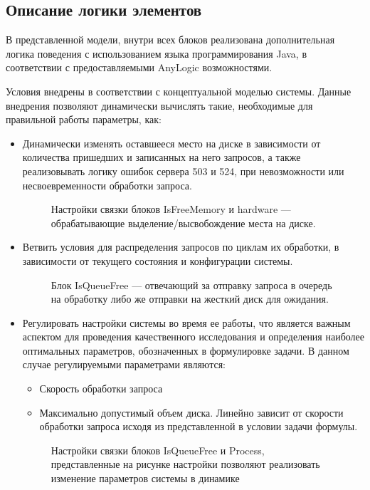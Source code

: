 \subsection{Описание логики элементов}
В представленной модели, внутри всех блоков реализована дополнительная логика поведения
с использованием языка программирования Java, в соответствии с предоставляемыми AnyLogic
возможностями.

Условия внедрены в соответствии с концептуальной моделью системы. Данные внедрения
позволяют динамически вычислять такие, необходимые для правильной работы параметры,
как:
\begin{itemize}
    \item Динамически изменять оставшееся место на диске в зависимости от количества
    пришедших и записанных на него запросов, а также реализовывать логику
    ошибок сервера 503 и 524, при невозможности или несвоевременности
    обработки запроса.
    \begin{figure} [h]
        \caption{Настройки связки блоков IsFreeMemory и hardware ---
        обрабатывающие выделение/высвобождение места на диске.}
    \end{figure}
    \item Ветвить условия для распределения запросов по циклам их обработки, в зависимости
    от текущего состояния и конфигурации системы.
    \begin{figure} [h]
        \caption{Блок IsQueueFree --- отвечающий за отправку запроса в очередь
        на обработку либо же отправки на жесткий диск для ожидания.}
    \end{figure}

    \item Регулировать настройки системы во время ее работы, что является важным
    аспектом для проведения качественного исследования и определения наиболее оптимальных
    параметров, обозначенных в формулировке задачи. В данном случае регулируемыми
    параметрами являются:
    \begin{itemize}
        \item Скорость обработки запроса
        \item Максимально допустимый объем диска. Линейно зависит от скорости обработки
        запроса исходя из представленной в условии задачи формулы.
    \end{itemize}

    \begin{figure} [h]
        \caption{Настройки связки блоков IsQueueFree и Process,
        представленные на рисунке настройки позволяют реализовать
        изменение параметров системы в динамике}
    \end{figure}


\end{itemize}
